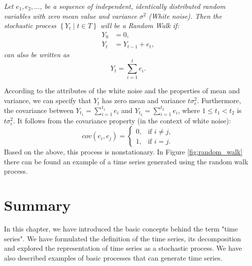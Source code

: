 \begin{definition}
\textit{Let $e_{1}, e_{2}, \ldots$, be a sequence of independent, identically distributed random variables with zero mean value and variance $\sigma^2$ (White noise). Then the stochastic process $\left\{Y_{t}\;|\; t \in T\right\}$ will be a Random Walk if:
\begin{equation}
\begin{aligned}
Y_0 &= 0, \\ 
Y_t &= Y_{t-1} + e_{t},
\end{aligned}
\end{equation}
can also be written as 
\begin{equation}
Y_{t} = \sum_{i=1}^{t} e_i.
\end{equation}}
\label{def_random_walk}
\end{definition}
According to the attributes of the white noise and the properties of mean and variance, we can specify that $Y_t$ has zero mean and variance $t\sigma_{e}^{2}$. Furthermore, the covariance between $Y_{t_1} = \sum_{i=1}^{t_1} e_i$ and $Y_{t_2} = \sum_{i=1}^{t_2} e_i$, where $1 \leq t_1 < t_2$ is $t\sigma_{e}^{2}$. It follows from the covariance property (in the context of white noise):
\begin{equation}
cov(e_{i}, e_{j}) = 
\begin{cases}
    0, & \text{if } i \neq j,\\
    1, & \text{if } i = j.
\end{cases}
\label{eq_cov_white_noise}
\end{equation}
Based on the above, this process is nonstationary. In Figure \ref{fig:random_walk} there can be found an example of a time series generated using the random walk process.  


\section{Summary}
In this chapter, we have introduced the basic concepts behind the term "time series". We have formulated the definition of the time series, its decomposition and explored the representation of time series as a stochastic process. We have also described examples of basic processes that can generate time series.